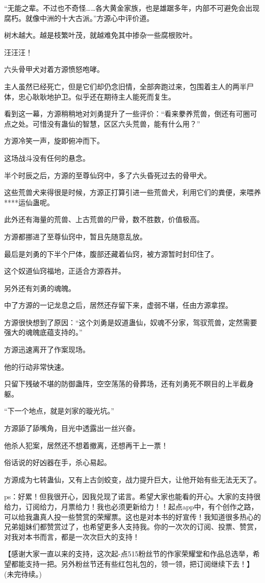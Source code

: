 \begin{this_body}
“无能之辈。不过也不奇怪……各大黄金家族，也是雄踞多年，内部不可避免会出现腐朽。就像中洲的十大古派。”方源心中评价道。

树木越大。越是枝繁叶茂，就越难免其中掺杂一些腐根败叶。

汪汪汪！

六头骨甲犬对着方源愤怒咆哮。

主人虽然已经死亡，但是它们却仍念旧情，全部奔跑过来，包围着主人的两半尸体，忠心耿耿地护卫。似乎还在期待主人能死而复生。

看到这一幕，方源稍稍地对刘勇提升了一些评价：“看来豢养荒兽，倒还有可圈可点之处。可惜没有蛊仙的智慧，区区六头荒兽，能有什么用？”

方源冷笑一声，旋即俯冲而下。

这场战斗没有任何的悬念。

半个时辰之后，方源的至尊仙窍中，多了六头昏死过去的骨甲犬。

这些荒兽犬来得很是时候，方源正打算引进一些荒兽犬，利用它们的粪便，来喂养****运仙蛊呢。

此外还有海量的荒兽、上古荒兽的尸骨，数不胜数，价值极高。

方源都挪进了至尊仙窍中，暂且先随意乱放。

最后是刘勇的下半个尸体，腹部还藏着仙窍，被方源暂时封印住了。

这个奴道仙窍福地，正适合方源吞并。

另外还有刘勇的魂魄。

中了方源的一记龙息之后，居然还存留下来，虚弱不堪，任由方源拿捏。

方源很快想到了原因：“这个刘勇是奴道蛊仙，奴魂不分家，驾驭荒兽，定然需要强大的魂魄底蕴支持的。”

方源迅速离开了作案现场。

他的行动非常快速。

只留下残破不堪的防御蛊阵，空空荡荡的骨葬场，还有刘勇死不瞑目的上半截身躯。

“下一个地点，就是刘家的璇光坑。”

方源舔了舔嘴角，目光中透露出一丝兴奋。

他杀人犯案，居然还不想着撤离，还想再干上一票！

俗话说的好凶器在手，杀心易起。

方源成为七转蛊仙，又有上古剑蛟变，战力提升巨大，让他开始有些无法无天了。

ps：好累！但我很开心，因我兑现了诺言。希望大家也能看的开心。大家的支持很给力，订阅给力，月票给力！我也必须更新给力！！起点app中，有个创作之路，可以给我蛊真人投一些赞赏的荣耀票。这也是对本书的好宣传！我知道很多热心的兄弟姐妹们都赞赏过了，也希望更多人支持我。你的一次次的订阅、投票、赞赏，对我对本书而言，都是一次次巨大的支持！

【感谢大家一直以来的支持，这次起-点515粉丝节的作家荣耀堂和作品总选举，希望都能支持一把。另外粉丝节还有些红包礼包的，领一领，把订阅继续下去！】(未完待续。)

\end{this_body}

